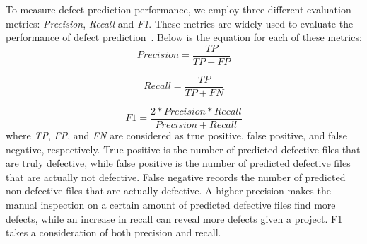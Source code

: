 To measure defect prediction performance, we employ three different evaluation metrics: \textit{Precision}, \textit{Recall} and \textit{F1}. These metrics are widely used to evaluate the performance of defect prediction~\cite{menzies2007data, menzies2010defect, nam2013transfer}. %
Below is the equation for each of these metrics:
\begin{equation}
\label{eq:precision}
Precision = \frac{TP}{TP+FP}
\end{equation}

\begin{equation}
\label{eq:recall}
Recall = \frac{TP}{TP+FN}
\end{equation}

\begin{equation}
\label{eq:f1}
F1 = \frac{2 * Precision * Recall}{Precision + Recall}
\end{equation}
where \textit{TP}, \textit{FP}, and \textit{FN} are considered as true positive, false positive, and false negative, respectively. True positive is the number of predicted defective files that are truly defective, while false positive is the number of predicted defective files that are actually not defective. False negative records the number of predicted non-defective files that are actually defective. A higher precision makes the manual inspection on a certain amount of predicted defective files find more defects, while an increase in recall can reveal more defects given a project. F1 takes a consideration of both precision and recall.
